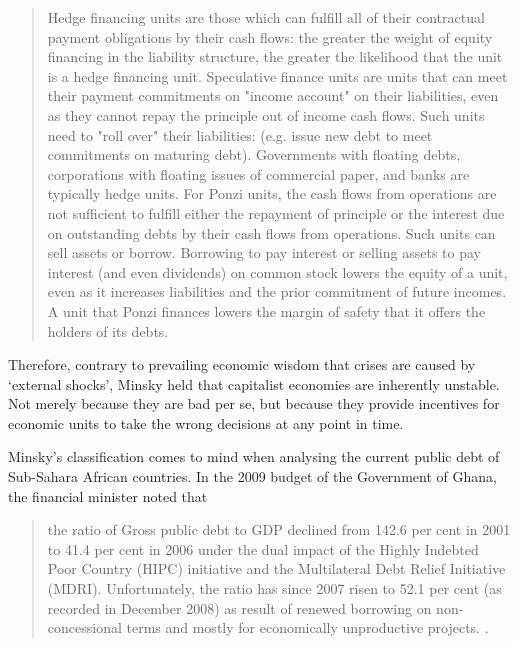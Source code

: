 \documentclass[a4paper]{article}
\begin{document}
	\begin{quote}
		Hedge financing units are those which can fulfill all of their contractual payment obligations by their cash flows: the greater the weight of equity financing in the liability structure, the greater the likelihood that the unit is a hedge financing unit. Speculative finance units are units that can meet their payment commitments on "income account" on their liabilities, even as they cannot repay the principle out of income cash flows. Such units need to "roll over" their liabilities: (e.g. issue new debt to meet commitments on maturing debt). Governments with floating debts, corporations with floating issues of commercial paper, and banks are typically hedge units. For Ponzi units, the cash flows from operations are not sufficient to fulfill either the repayment of principle or the interest due on outstanding debts by their cash flows from operations. Such units can sell assets or borrow. Borrowing to pay interest or selling assets to pay interest (and even dividends) on common stock lowers the equity of a unit, even as it increases liabilities and the prior commitment of future incomes. A unit that Ponzi finances lowers the margin of safety that it offers the holders of its debts.\cite{Minsky1992}
	\end{quote}
	
	Therefore, contrary to prevailing economic wisdom that crises are caused by `external shocks', Minsky held that capitalist economies are inherently unstable. Not merely because they are bad per se, but because they provide incentives for economic units to take the wrong decisions at any point in time.
	
	
	Minsky's classification comes to mind when analysing the current public debt of Sub-Sahara African countries. In the 2009 budget of the Government of Ghana, the financial minister noted that 
	
	\begin{quote}
		the ratio of Gross public debt to GDP declined from 142.6 per cent in 2001 to 41.4 per cent in 2006 under the dual impact of the Highly Indebted Poor Country (HIPC) initiative and the Multilateral Debt Relief Initiative (MDRI). Unfortunately, the ratio has since 2007 risen to 52.1 per cent (as recorded in December 2008) as result of renewed borrowing on non-concessional terms and mostly for economically unproductive projects. \cite{Duffuor2009}.
	\end{quote}
	
\end{document}
